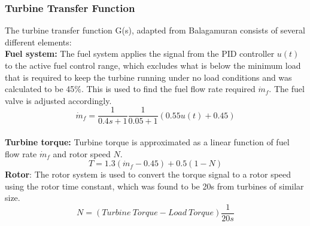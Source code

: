 \documentclass[11pt, oneside]{article}
\begin{document}
\subsubsection{Turbine Transfer Function}
The turbine transfer function G(s), adapted from Balagamuran \cite{balagamuran} consists of several different elements:
\\\textbf{Fuel system:} The fuel system applies the signal from the PID controller $u(t)$ to the active fuel control range, which excludes what is below the minimum load that is required to keep the turbine running under no load conditions and was calculated to be 45\%. This is used to find the fuel flow rate required $\dot{m}_f$. The fuel valve is adjusted accordingly.
\begin{equation}
\dot{m}_f = \frac{1}{0.4s + 1} \frac{1}{0.05 + 1} (0.55u(t) + 0.45)
\end{equation}
\\\textbf{Turbine torque:} Turbine torque is approximated as a linear function of fuel flow rate $\dot{m}_f$ and rotor speed $N$.
\begin{equation}
T = 1.3(\dot{m}_f - 0.45) + 0.5(1 - N)
\end{equation}
\textbf{Rotor}: The rotor system is used to convert the torque signal to a rotor speed using the rotor time constant, which was found to be 20s from turbines of similar size.
\begin{equation}
N = (Turbine \ Torque - Load \ Torque)\frac{1}{20s}
\end{equation}
\end{document}
